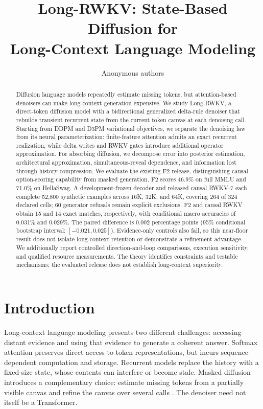 \documentclass{article}
\theoremstyle{remark}\newtheorem{remark}[theorem]{Remark}
\begin{document}
\title{Long-RWKV: State-Based Diffusion for\\Long-Context Language Modeling}
\author{Anonymous authors}
\maketitle
\begin{abstract}
Diffusion language models repeatedly estimate missing tokens, but attention-based denoisers can make long-context generation expensive. We study Long-RWKV, a direct-token diffusion model with a bidirectional generalized delta-rule denoiser that rebuilds transient recurrent state from the current token canvas at each denoising call. Starting from DDPM and D3PM variational objectives, we separate the denoising law from its neural parameterization: finite-feature attention admits an exact recurrent realization, while delta writes and RWKV gates introduce additional operator approximation. For absorbing diffusion, we decompose error into posterior estimation, architectural approximation, simultaneous-reveal dependence, and information lost through history compression. We evaluate the existing F2 release, distinguishing causal option-scoring capability from masked generation. F2 scores 46.9\% on full MMLU and 71.0\% on HellaSwag. A development-frozen decoder and released causal RWKV-7 each complete 52,800 synthetic examples across 16K, 32K, and 64K, covering 264 of 324 declared cells; 60 generator refusals remain explicit exclusions. F2 and causal RWKV obtain 15 and 14 exact matches, respectively, with conditional macro accuracies of 0.031\% and 0.029\%. The paired difference is 0.002 percentage points (95\% conditional bootstrap interval: $[-0.021,0.025]$). Evidence-only controls also fail, so this near-floor result does not isolate long-context retention or demonstrate a refinement advantage. We additionally report controlled direction-and-loop comparisons, execution sensitivity, and qualified resource measurements. The theory identifies constraints and testable mechanisms; the evaluated release does not establish long-context superiority.
\end{abstract}

\section{Introduction}
\label{m:intro}

Long-context language modeling presents two different challenges: accessing distant evidence and using that evidence to generate a coherent answer. Softmax attention preserves direct access to token representations, but incurs sequence-dependent computation and storage. Recurrent models replace the history with a fixed-size state, whose contents can interfere or become stale. Masked diffusion introduces a complementary choice: estimate missing tokens from a partially visible canvas and refine the canvas over several calls \citep{mdlm,llada}. The denoiser need not itself be a Transformer.
\end{document}
